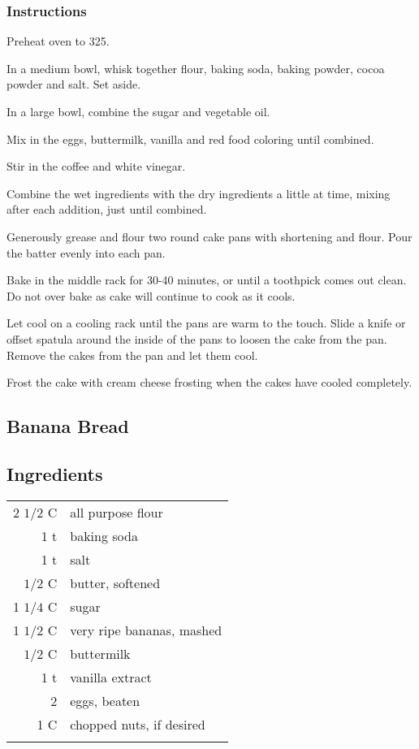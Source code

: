 \documentclass[12pt,landscape,twoside,twocolumn, openright, titlepage, draft]{book}
\begin{document}
\subsubsection{Instructions}

Preheat oven to 325.

In a medium bowl, whisk together flour, baking soda, baking powder,
cocoa powder and salt. Set aside.

In a large bowl, combine the sugar and vegetable oil.

Mix in the eggs, buttermilk, vanilla and red food coloring until combined.

Stir in the coffee and white vinegar.

Combine the wet ingredients with the dry ingredients a little at time,
mixing after each addition, just until combined.

Generously grease and flour two round cake pans with shortening and flour.
Pour the batter evenly into each pan.

Bake in the middle rack for 30-40 minutes, or until a toothpick comes
out clean. Do not over bake as cake will continue to cook as it cools.

Let cool on a cooling rack until the pans are warm to the touch.
Slide a knife or offset spatula around the inside of the pans to
loosen the cake from the pan.  Remove the cakes from the pan and let
them cool.  

Frost the cake with cream cheese frosting when the cakes have cooled
completely.

\subsection{Banana Bread}
\subsection{Ingredients}
\begin{tabular}{r p{1.5in}}
  2 $1/2$ C & all purpose flour \\
  1 t       & baking soda \\
  1 t       & salt \\
  $1/2$ C   & butter, softened  \\
  1 $1/4$ C & sugar \\
  1 $1/2$ C & very ripe bananas, mashed  \\
  $1/2$ C   & buttermilk \\
  1 t       & vanilla extract \\
  2         & eggs, beaten \\
  1 C       & chopped nuts, if desired \\ \\
\end{tabular}
\end{document}
